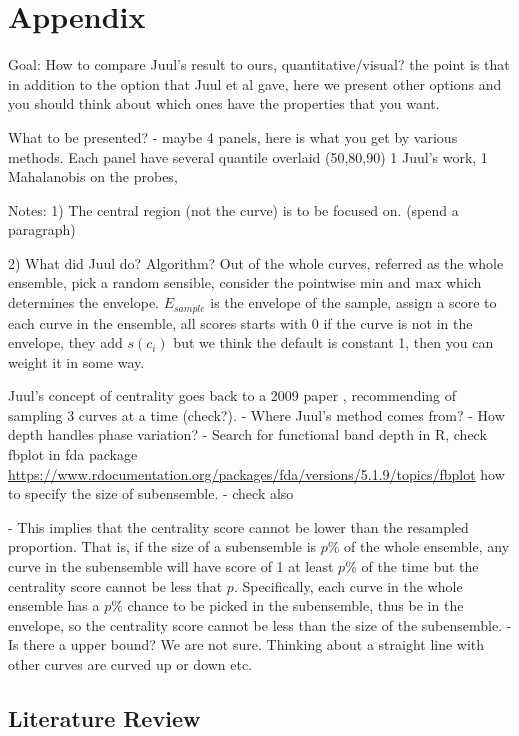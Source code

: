 \documentclass[12pt]{article}
\theoremstyle{definition} %
\begin{document}
\section{Appendix}


Goal: 
 How to compare Juul's result to ours, quantitative/visual? the point is that in addition to the option that Juul et al gave, here we present other options and you should think about which ones have the properties that you want.
 
What to be presented? 
- maybe 4 panels, here is what you get by various methods. Each panel have several quantile overlaid (50,80,90) 1 Juul's work, 1 Mahalanobis on the probes,  

Notes:
1) The central region (not the curve) is to be focused on. (spend a paragraph) 

2) What did Juul do? Algorithm? 
Out of the whole curves, referred as the whole ensemble, pick a random sensible, consider the pointwise min and max which determines the envelope. $E_{sample}$ is the envelope of the sample, assign a score to each curve in the ensemble, all scores starts with 0 if the curve is not in the envelope, they add $s(c_i)$ but we think the default is constant 1, then you can weight it in some way. 

Juul's concept of centrality goes back to a 2009 paper \cite{lopez2009concept}, recommending of sampling 3 curves at a time (check?). 
- Where Juul's method comes from?
- How depth handles phase variation?
- Search for functional band depth in R, check fbplot in fda package \url{https://www.rdocumentation.org/packages/fda/versions/5.1.9/topics/fbplot} how to specify the size of subensemble.
- check also \cite{sun2012exact}

- This implies that the centrality score cannot be lower than the resampled proportion. 
That is, if the size of a subensemble is $p\%$ of the whole ensemble, any curve in the subensemble will have score of 1 at least $p\%$ of the time but the centrality score cannot be less that $p$. Specifically, each curve in the whole ensemble has a $p\%$ chance to be picked in the subensemble, thus be in the envelope, so the centrality score cannot be less than the size of the subensemble.     
- Is there a upper bound? We are not sure. Thinking about a straight line with other curves are curved up or down etc.
\subsection{Literature Review}
\citep{juul2021fixed}
\end{document}
